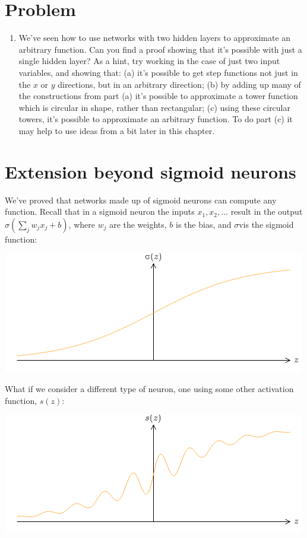 \section*{Problem}

\begin{enumerate}
\item
We've seen how to use networks with two hidden layers to approximate an arbitrary function. Can you find a proof showing that it's possible with just a single hidden layer? As a hint, try working in the case of just two input variables, and showing that: (a) it's possible to get step functions not just in the $x$ or $y$ directions, but in an arbitrary direction; (b) by adding up many of the constructions from part (a) it's possible to approximate a tower function which is circular in shape, rather than rectangular; (c) using these circular towers, it's possible to approximate an arbitrary function. To do part (c) it may help to use ideas from a bit later in this chapter.

\end{enumerate}

\section{Extension beyond sigmoid neurons}

We've proved that networks made up of sigmoid neurons can compute any function. Recall that in a sigmoid neuron the inputs $x_1,x_2,\ldots$ result in the output $\sigma(\sum_j w_jx_j+b)$, where $w_j$ are the weights, $b$ is the bias, and $\sigma$vis the sigmoid function:

{\centering \includegraphics[width=.5\textwidth,]{pic/sigmoidfunction02} \par}

What if we consider a different type of neuron, one using some other activation function, $s(z)$:

{\centering \includegraphics[width=.5\textwidth,]{pic/sigmoidfunction03} \par}

